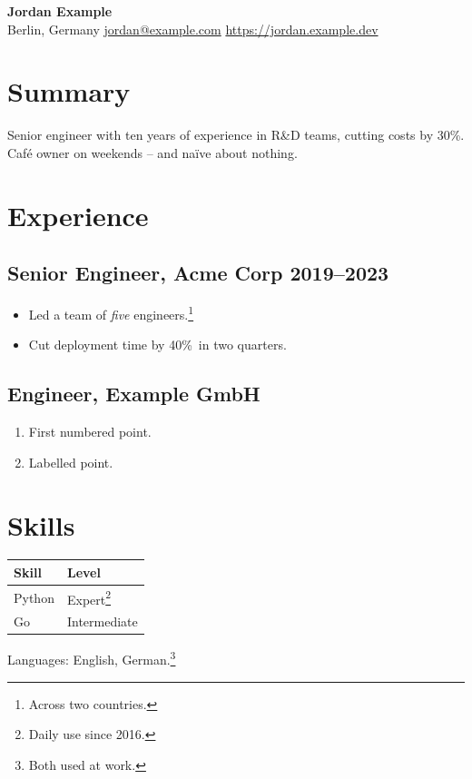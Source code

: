 \documentclass[11pt]{article}
\begin{document}
\begin{center}
{\LARGE \textbf{Jordan Example}}\\
Berlin, Germany \textbar{} \href{mailto:jordan@example.com}{jordan@example.com} \textbar{} \url{https://jordan.example.dev}
\end{center}

\section*{Summary}
Senior engineer with ten years of experience in R\&D teams, cutting costs by 30\%.
Caf\'e owner on weekends -- and na\"ive about nothing.

\section{Experience}
\subsection{Senior Engineer, Acme Corp \hfill 2019--2023}
\begin{itemize}
  \item Led a team of \emph{five} engineers.\footnote{Across two countries.}
  \item Cut deployment time by 40\%~in two quarters.
\end{itemize}

\subsection*{Engineer, Example GmbH}
\begin{enumerate}
  \item First numbered point.
  \item[--] Labelled point.
\end{enumerate}

\section{Skills}
\begin{tabular}{l|l}
\hline
Skill & Level \\
\hline
Python & Expert\footnote{Daily use since 2016.} \\
Go & Intermediate \\
\hline
\end{tabular}

\vspace{1em}
\noindent Languages: English, German.\footnote{Both used at work.}
\end{document}
